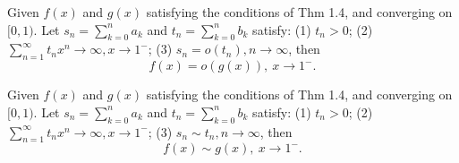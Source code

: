\begin{cor}
    Given $f(x)$ and $g(x)$ satisfying the conditions of Thm 1.4, and converging on $[0,1)$. Let $s_n = \sum_{k=0}^{n} a_k$ and $t_n = \sum_{k=0}^{n} b_k$ satisfy: (1) $t_n > 0$; (2) $\sum_{n=1}^{\infty} t_nx^{n}\to\infty, x\to 1^{-}$; (3) $s_n = o(t_n), n\to\infty$, then $$f(x) = o(g(x)),\ x\to 1^{-}.$$
\end{cor}
\begin{cor}
    Given $f(x)$ and $g(x)$ satisfying the conditions of Thm 1.4, and converging on $[0,1)$. Let $s_n = \sum_{k=0}^{n} a_k$ and $t_n = \sum_{k=0}^{n} b_k$ satisfy: (1) $t_n > 0$; (2) $\sum_{n=1}^{\infty} t_nx^{n}\to\infty, x\to 1^{-}$; (3) $s_n \sim t_n, n\to\infty$, then $$f(x) \sim g(x),\ x\to 1^{-}.$$
\end{cor}

